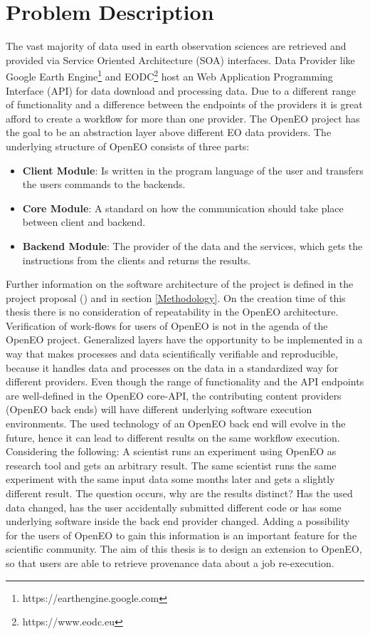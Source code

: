 \documentclass[draft,final]{vutinfth} %
\begin{document}
\section{Problem Description}\label{Problem}
The vast majority of data used in earth observation sciences are retrieved and provided via Service Oriented Architecture (SOA) interfaces. Data Provider like Google Earth Engine\footnote{https://earthengine.google.com} and EODC\footnote{https://www.eodc.eu} host an Web Application Programming Interface (API) for data download and processing data. Due to a different range of functionality and a difference between the endpoints of the providers it is great afford to create a workflow for more than one provider. The OpenEO project has the goal to be an abstraction layer above different EO data providers. The underlying structure of OpenEO consists of three parts:

\begin{itemize}
	\item \textbf{Client Module}: Is written in the program language of the user and transfers the users commands to the backends.
	\item \textbf{Core Module}: A standard on how the communication should take place between client and backend.
	\item \textbf{Backend Module}: The provider of the data and the services, which gets the instructions from the clients and returns the results.
\end{itemize}   
Further information on the software architecture of the project is defined in the project proposal (\cite{openeo}) and in section \ref{Methodology}. On the creation time of this thesis there is no consideration of repeatability in the OpenEO architecture. Verification of work-flows for users of OpenEO is not in the agenda of the OpenEO project. Generalized layers have the opportunity to be implemented in a way that makes processes and data scientifically verifiable and reproducible, because it handles data and processes on the data in a standardized way for different providers. Even though the range of functionality and the API endpoints are well-defined in the OpenEO core-API, the contributing content providers (OpenEO back ends) will have different underlying software execution environments. The used technology of an OpenEO back end will evolve in the future, hence it can lead to different results on the same workflow execution. Considering the following: A scientist runs an experiment using OpenEO as research tool and gets an arbitrary result. The same scientist runs the same experiment with the same input data some months later and gets a slightly different result. The question occurs, why are the results distinct? Has the used data changed, has the user accidentally submitted different code or has some underlying software inside the back end provider changed. Adding a possibility for the users of OpenEO to gain this information is an important feature for the scientific community. The aim of this thesis is to design an extension to OpenEO, so that users are able to retrieve provenance data about a job re-execution. \cite{openeo}
\end{document}
